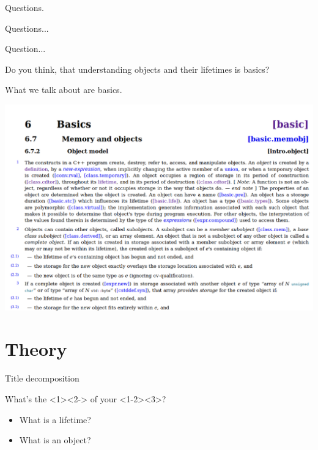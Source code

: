 \documentclass{panicsoftware-presentation}
\makeatletter
\newenvironment{itemizeSeq}{\begin{itemize}[<+-|alert@+>]}{\end{itemize}}
\makeatother
\begin{document}
\begin{frame}{Questions.}
	
	\vfill
	\centerline{Questions...}
	\vfill

\end{frame}

\begin{frame}{Question...}

\centerline{Do you think, that understanding objects and their lifetimes is \alert{basics}?}

\end{frame}

\begin{frame}{What we talk about are basics.}

	\centering
	\includegraphics[width=1.0\linewidth]{graphics/objects_basics.png}

\end{frame}


\section{Theory}

\begin{frame}{Title decomposition}

\centerline{What's the <1><2-> of your <1-2><3>?}
\pause
\begin{itemizeSeq}
	\item What is a lifetime?
	\item What is an object?
\end{itemizeSeq}

\end{frame}
\end{document}
